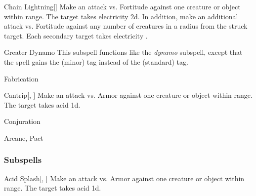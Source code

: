 \begin{ability}[\nth{4}]{Chain Lightning}[]
Make an attack vs. Fortitude against one creature or object within \rngmed range.
\hit The target takes electricity  \plus2d.
In addition, make an additional attack vs. Fortitude against any number of creatures in a \areamed radius from the struck target.
\hit Each secondary target takes electricity .
\end{ability}
\vspace{0.25em}


\begin{ability}[\nth{4}]{Greater Dynamo}
This subspell functions like the \textit{dynamo} subspell, except that the spell gains the  (minor) tag instead of the  (standard) tag.
\end{ability}
\vspace{0.25em}

\newpage
\begin{spellsection}{Fabrication}

\begin{spellheader}
\end{spellheader}


\begin{ability}{Cantrip}[, ]
Make an attack vs. Armor against one creature or object within \rngmed range.
\hit The target takes acid  \minus1d.
\end{ability}




 Conjuration

 Arcane, Pact
\end{spellsection}


\subsubsection{Subspells}


\begin{ability}[\nth{1}]{Acid Splash}[, ]
Make an attack vs. Armor against one creature or object within \rngmed range.
\hit The target takes acid  \plus1d.
\end{ability}
\vspace{0.25em}


